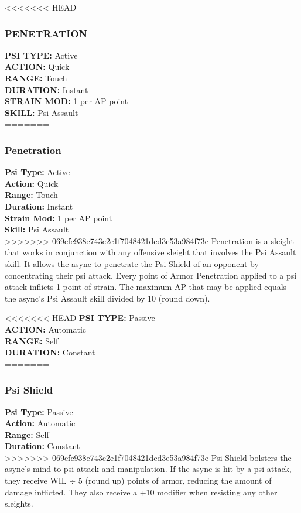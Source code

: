 <<<<<<< HEAD \subsubsection{PENETRATION} \textbf{PSI TYPE:} Active \\ \textbf{ACTION:} Quick \\ \textbf{RANGE:} Touch \\ \textbf{DURATION:} Instant \\ \textbf{STRAIN MOD:} 1 per AP point \\ \textbf{SKILL:} Psi Assault \\ ======= \subsubsection{Penetration} \textbf{Psi Type:} Active \\ \textbf{Action:} Quick \\ \textbf{Range:} Touch \\ \textbf{Duration:} Instant \\ \textbf{Strain Mod:} 1 per AP point \\ \textbf{Skill:} Psi Assault \\ >>>>>>> 069efc938e743c2e1f7048421dcd3e53a984f73e Penetration is a sleight that works in conjunction with any offensive sleight that involves the Psi Assault skill. It allows the async to penetrate the Psi Shield of an opponent by concentrating their psi attack. Every point of Armor Penetration applied to a psi attack inflicts 1 point of strain. The maximum AP that may be applied equals the async’s Psi Assault skill divided by 10 (round down). 

<<<<<<< HEAD  \textbf{PSI TYPE:} Passive \\ \textbf{ACTION:} Automatic \\ \textbf{RANGE:} Self \\ \textbf{DURATION:} Constant \\ ======= \subsubsection{Psi Shield} \textbf{Psi Type:} Passive \\ \textbf{Action:} Automatic \\ \textbf{Range:} Self \\ \textbf{Duration:} Constant \\ >>>>>>> 069efc938e743c2e1f7048421dcd3e53a984f73e Psi Shield bolsters the async’s mind to psi attack and manipulation. If the async is hit by a psi attack, they receive WIL $\div$ 5 (round up) points of armor, reducing the amount of damage inflicted. They also receive a +10 modifier when resisting any other sleights. 

